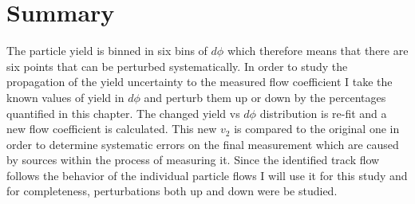 \section{Summary}
The particle yield is binned in six bins of $d\phi$ which therefore means that there are six points that can be perturbed systematically. In order to study the propagation of the yield uncertainty to the measured flow coefficient I take the known values of yield in $d\phi$ and perturb them up or down by the percentages quantified in this chapter. The changed yield vs $d\phi$ distribution is re-fit and a new flow coefficient is calculated. This new $v_2$ is compared to the original one in order to determine systematic errors on the final measurement which are caused by sources within the process of measuring it. Since the identified track flow follows the behavior of the individual particle flows I will use it for this study and for completeness, perturbations both up and down were be studied. 



